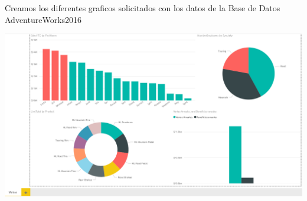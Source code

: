 Creamos los diferentes graficos solicitados con los datos de la Base de Datos AdventureWorks2016


	\begin{center}
	\includegraphics[width=17cm]{./Imagenes/Img2}
	\end{center}


